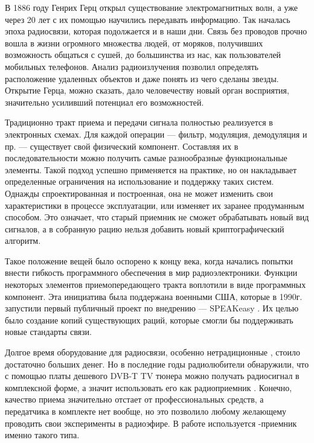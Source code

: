 \label{sec:intro}

В 1886 году Генрих Герц открыл существование электромагнитных волн, а уже через 20 лет с их помощью научились передавать информацию. Так началась эпоха радиосвязи, которая подолжается и в наши дни. Связь без проводов прочно вошла в жизни огромного множества людей, от моряков, получивших возможность общаться с сушей, до большинства из нас, как пользователей мобильных телефонов. Анализ радиоизлучения позволил определять расположение удаленных объектов и даже понять из чего сделаны звезды. Открытие Герца, можно сказать, дало человечеству новый орган восприятия, значительно усиливший потенциал его возможностей.

Традиционно тракт приема и передачи сигнала полностью реализуется в электронных схемах. Для каждой операции --- фильтр, модуляция, демодуляция и пр. --- существует свой физический компонент. Составляя их в последовательности можно получить самые разнообразные функциональные элементы. Такой подход успешно применяется на практике, но он накладывает определенные ограничения на использование и поддержку таких систем. Однажды спроектированная и построенная, она не может изменить свои характеристики в процессе эксплуатации, или изменяет их заранее продуманным способом. Это означает, что старый приемник не сможет обрабатывать новый вид сигналов, а в собранную рацию нельзя добавить новый криптографический алгоритм.

Такое положение вещей было оспорено к концу  века, когда начались попытки внести гибкость программного обеспечения в мир радиоэлектроники. Функции некоторых элементов приемопередающего тракта воплотили в виде программных компонент. Эта инициатива была поддержана военными США, которые в 1990г. запустили первый публичный проект по внедрению \SDR --- SPEAKeasy \cite{speakeasy_wiki}. Их целью было создание копий существующих раций, которые смогли бы поддерживать новые стандарты связи.

Долгое время оборудование для радиосвязи, особенно нетрадиционные \SDR, стоило достаточно больших денег. Но в последние годы радиолюбители обнаружили, что с помощью платы дешевого DVB-T TV тюнера можно получать радиосигнал в комплексной форме, а значит использовать его как радиоприемник \cite{rtl_sdr_about}. Конечно, качество приема значительно отстает от профессиональных средств, а передатчика в комплекте нет вообще, но это позволило любому желающему проводить свои эксперименты в радиоэфире. В работе используется \SDR-приемник именно такого типа.


